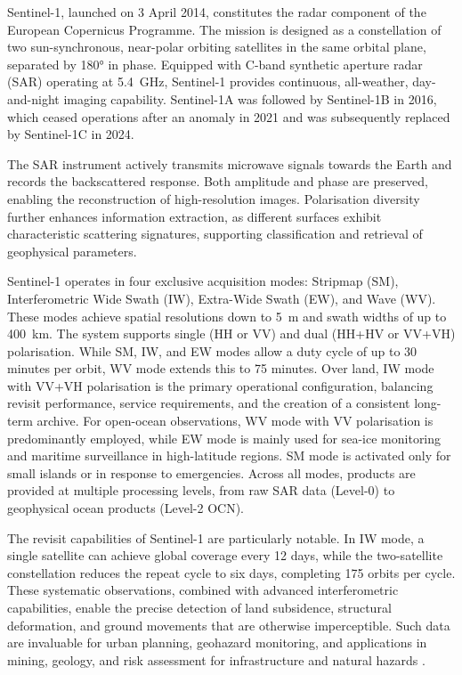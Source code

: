 Sentinel-1, launched on 3 April 2014, constitutes the radar component of the European Copernicus Programme. The mission is designed as a constellation of two sun-synchronous, near-polar orbiting satellites in the same orbital plane, separated by 180° in phase. Equipped with C-band synthetic aperture radar (SAR) operating at 5.4~GHz, Sentinel-1 provides continuous, all-weather, day-and-night imaging capability. Sentinel-1A was followed by Sentinel-1B in 2016, which ceased operations after an anomaly in 2021 and was subsequently replaced by Sentinel-1C in 2024.  

The SAR instrument actively transmits microwave signals towards the Earth and records the backscattered response. Both amplitude and phase are preserved, enabling the reconstruction of high-resolution images. Polarisation diversity further enhances information extraction, as different surfaces exhibit characteristic scattering signatures, supporting classification and retrieval of geophysical parameters.  

Sentinel-1 operates in four exclusive acquisition modes: Stripmap (SM), Interferometric Wide Swath (IW), Extra-Wide Swath (EW), and Wave (WV). These modes achieve spatial resolutions down to 5~m and swath widths of up to 400~km. The system supports single (HH or VV) and dual (HH+HV or VV+VH) polarisation. While SM, IW, and EW modes allow a duty cycle of up to 30 minutes per orbit, WV mode extends this to 75 minutes. Over land, IW mode with VV+VH polarisation is the primary operational configuration, balancing revisit performance, service requirements, and the creation of a consistent long-term archive. For open-ocean observations, WV mode with VV polarisation is predominantly employed, while EW mode is mainly used for sea-ice monitoring and maritime surveillance in high-latitude regions. SM mode is activated only for small islands or in response to emergencies. Across all modes, products are provided at multiple processing levels, from raw SAR data (Level-0) to geophysical ocean products (Level-2 OCN).  

The revisit capabilities of Sentinel-1 are particularly notable. In IW mode, a single satellite can achieve global coverage every 12 days, while the two-satellite constellation reduces the repeat cycle to six days, completing 175 orbits per cycle. These systematic observations, combined with advanced interferometric capabilities, enable the precise detection of land subsidence, structural deformation, and ground movements that are otherwise imperceptible. Such data are invaluable for urban planning, geohazard monitoring, and applications in mining, geology, and risk assessment for infrastructure and natural hazards \cite{sentiwiki}.  

